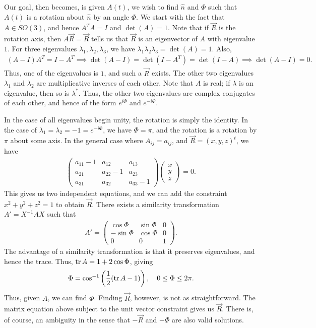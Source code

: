 Our goal, then becomes, is given $A(t)$, we wish to find $\hat{n}$ and $\Phi$ such that $A(t)$ is a rotation about $\hat{n}$ by an angle $\Phi$. We start with the fact that $A \in SO(3)$, and hence $A^{T}A = I$ and $\det(A) = 1$. Note that if $\vec{R}$ is the rotation axis, then $A\vec{R} = \vec{R}$ tells us that $\vec{R}$ is an eigenvector of $A$ with eigenvalue $1$. For three eigenvalues $\lambda_{1},\lambda_{2},\lambda_{3}$, we have $\lambda_{1}\lambda_{2}\lambda_{3} = \det(A) = 1$. Also,
\begin{align}
    (A-I)A^{T} = I - A^{T} \implies \det(A-I) = \det(I-A^{T}) = \det(I-A) \implies \det(A-I) = 0.
\end{align}
Thus, one of the eigenvalues is $1$, and such a $\vec{R}$ exists. The other two eigenvalues $\lambda_{1}$ and $\lambda_{2}$ are multiplicative inverses of each other. Note that $A$ is real; if $\lambda$ is an eigenvalue, then so is $\lambda^{*}$. Thus, the other two eigenvalues are complex conjugates of each other, and hence of the form $e^{i\Phi}$ and $e^{-i\Phi}$.

In the case of all eigenvalues begin unity, the rotation is simply the identity. In the case of $\lambda_{1} = \lambda_{2} = -1 = e^{-i\Phi}$, we have $\Phi = \pi$, and the rotation is a rotation by $\pi$ about some axis. In the general case where $A_{ij} = a_{ij}$, and $\vec{R} = (x,y,z)^{t}$, we have
\begin{align}
    \begin{pmatrix}
        a_{11}-1 & a_{12} & a_{13} \\
        a_{21} & a_{22}-1 & a_{23} \\
        a_{31} & a_{32} & a_{33}-1
    \end{pmatrix} \begin{pmatrix}
        x \\ y \\ z
    \end{pmatrix} = 0.
\end{align}
This gives us two independent equations, and we can add the constraint $x^{2}+y^{2}+z^{2} = 1$ to obtain $\vec{R}$. There exists a similarity transformation $A' = X^{-1}AX$ such that
\begin{align}
    A' = \begin{pmatrix}
        \cos \Phi & \sin \Phi & 0 \\
        -\sin \Phi & \cos \Phi & 0 \\
        0 & 0 & 1
    \end{pmatrix}.
\end{align}
The advantage of a similarity transformation is that it preserves eigenvalues, and hence the trace. Thus, $\operatorname{tr} A = 1 + 2\cos \Phi$, giving
\begin{align}
    \Phi = \cos^{-1} \left( \frac{1}{2}(\operatorname{tr} A - 1) \right), \quad 0 \leq \Phi \leq 2\pi.
\end{align}
Thus, given $A$, we can find $\Phi$. Finding $\vec{R}$, however, is not as straightforward. The matrix equation above subject to the unit vector constraint gives us $\vec{R}$. There is, of course, an ambiguity in the sense that $-\vec{R}$ and $-\Phi$ are also valid solutions. 

